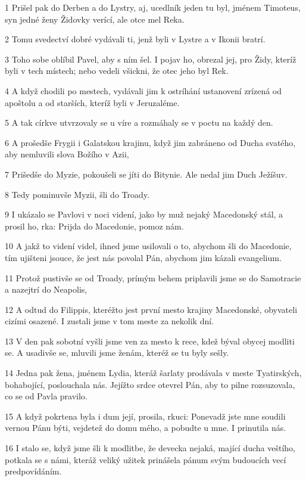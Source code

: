\par 1 Prišel pak do Derben a do Lystry, aj, ucedlník jeden tu byl, jménem Timoteus, syn jedné ženy Židovky verící, ale otce mel Reka.
\par 2 Tomu svedectví dobré vydávali ti, jenž byli v Lystre a v Ikonii bratrí.
\par 3 Toho sobe oblíbil Pavel, aby s ním šel. I pojav ho, obrezal jej, pro Židy, kteríž byli v tech místech; nebo vedeli všickni, že otec jeho byl Rek.
\par 4 A když chodili po mestech, vydávali jim k ostríhání ustanovení zrízená od apoštolu a od starších, kteríž byli v Jeruzaléme.
\par 5 A tak církve utvrzovaly se u víre a rozmáhaly se v poctu na každý den.
\par 6 A prošedše Frygii i Galatskou krajinu, když jim zabráneno od Ducha svatého, aby nemluvili slova Božího v Azii,
\par 7 Prišedše do Myzie, pokoušeli se jíti do Bitynie. Ale nedal jim Duch Ježíšuv.
\par 8 Tedy pominuvše Myzii, šli do Troady.
\par 9 I ukázalo se Pavlovi v noci videní, jako by muž nejaký Macedonský stál, a prosil ho, rka: Prijda do Macedonie, pomoz nám.
\par 10 A jakž to videní videl, ihned jsme usilovali o to, abychom šli do Macedonie, tím ujišteni jsouce, že jest nás povolal Pán, abychom jim kázali evangelium.
\par 11 Protož pustivše se od Troady, prímým behem priplavili jsme se do Samotracie a nazejtrí do Neapolis,
\par 12 A odtud do Filippis, kteréžto jest první mesto krajiny Macedonské, obyvateli cizími osazené. I zustali jsme v tom meste za nekolik dní.
\par 13 V den pak sobotní vyšli jsme ven za mesto k rece, kdež býval obycej modliti se. A usadivše se, mluvili jsme ženám, kteréž se tu byly sešly.
\par 14 Jedna pak žena, jménem Lydia, kteráž šarlaty prodávala v meste Tyatirských, bohabojící, poslouchala nás. Jejížto srdce otevrel Pán, aby to pilne rozsuzovala, co se od Pavla pravilo.
\par 15 A když pokrtena byla i dum její, prosila, rkuci: Ponevadž jste mne soudili vernou Pánu býti, vejdetež do domu mého, a pobudte u mne. I prinutila nás.
\par 16 I stalo se, když jsme šli k modlitbe, že devecka nejaká, mající ducha veštího, potkala se s námi, kteráž veliký užitek prinášela pánum svým budoucích vecí predpovídáním.
